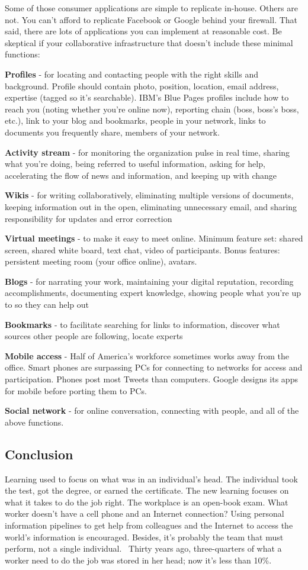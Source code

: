 Some of those consumer applications are simple to replicate in-house.
Others are not. You can't afford to replicate Facebook or Google behind
your firewall. That said, there are lots of applications you can
implement at reasonable cost. Be skeptical if your collaborative
infrastructure that doesn't include these minimal functions:

\textbf{Profiles} - for locating and contacting people with the right
skills and background. Profile should contain photo, position, location,
email address, expertise (tagged so it's searchable). IBM's Blue Pages
profiles include how to reach you (noting whether you're online now),
reporting chain (boss, boss's boss, etc.), link to your blog and
bookmarks, people in your network, links to documents you frequently
share, members of your network.

\textbf{Activity stream} - for monitoring the organization pulse in real
time, sharing what you're doing, being referred to useful information,
asking for help, accelerating the flow of news and information, and
keeping up with change

\textbf{Wikis} - for writing collaboratively, eliminating multiple
versions of documents, keeping information out in the open, eliminating
unnecessary email, and sharing responsibility for updates and error
correction

\textbf{Virtual meetings} - to make it easy to meet online. Minimum
feature set: shared screen, shared white board, text chat, video of
participants. Bonus features: persistent meeting room (your office
online), avatars.

\textbf{Blogs} - for narrating your work, maintaining your digital
reputation, recording accomplishments, documenting expert knowledge,
showing people what you're up to so they can help out

\textbf{Bookmarks} - to facilitate searching for links to information,
discover what sources other people are following, locate experts

\textbf{Mobile access} - Half of America's workforce sometimes works
away from the office. Smart phones are surpassing PCs for connecting to
networks for access and participation. Phones post most Tweets than
computers. Google designs its apps for mobile before porting them to
PCs.

\textbf{Social network} - for online conversation, connecting with
people, and all of the above functions.

\subsection{Conclusion}

Learning used to focus on what was in an individual's head. The
individual took the test, got the degree, or earned the certificate. The
new learning focuses on what it takes to do the job right. The workplace
is an open-book exam. What worker doesn't have a cell phone and an
Internet connection? Using personal information pipelines to get help
from colleagues and the Internet to access the world's information is
encouraged. Besides, it's probably the team that must perform, not a
single individual. ~Thirty years ago, three-quarters of what a worker
need to do the job was stored in her head; now it's less than 10\%. ~
